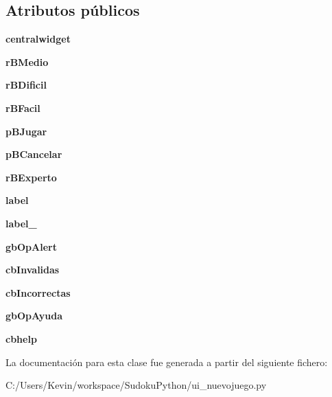 \subsection*{Atributos públicos}
\begin{DoxyCompactItemize}
\item 
{\bfseries centralwidget}\label{classui__nuevojuego_1_1_ui___nuevo_juego_a32725a1c9d0ae4f73ea1b0cec5cbdfbe}

\item 
{\bfseries r\-B\-Medio}\label{classui__nuevojuego_1_1_ui___nuevo_juego_a888ccb3b588cbf785b9616702bc3cf39}

\item 
{\bfseries r\-B\-Dificil}\label{classui__nuevojuego_1_1_ui___nuevo_juego_a701cd00892769efdea575c4cb07cec4c}

\item 
{\bfseries r\-B\-Facil}\label{classui__nuevojuego_1_1_ui___nuevo_juego_a60e661f4819967b6d2f09279f49823f4}

\item 
{\bfseries p\-B\-Jugar}\label{classui__nuevojuego_1_1_ui___nuevo_juego_ad4dc95d57abca02628607c7db8595490}

\item 
{\bfseries p\-B\-Cancelar}\label{classui__nuevojuego_1_1_ui___nuevo_juego_a5fe6252995b4373f69fcd50dfa772022}

\item 
{\bfseries r\-B\-Experto}\label{classui__nuevojuego_1_1_ui___nuevo_juego_a4003ba3feb6933eca550eb5ed7523190}

\item 
{\bfseries label}\label{classui__nuevojuego_1_1_ui___nuevo_juego_a7c90438e0dd91760216404e2faf1d3b6}

\item 
{\bfseries label\-\_}\label{classui__nuevojuego_1_1_ui___nuevo_juego_aa983f05d01b60f683dec9796eb59edf2}

\item 
{\bfseries gb\-Op\-Alert}\label{classui__nuevojuego_1_1_ui___nuevo_juego_ac874e4a3457eb4f7edc5c8b24c69afbf}

\item 
{\bfseries cb\-Invalidas}\label{classui__nuevojuego_1_1_ui___nuevo_juego_af2cfdb7c27411d43f24feac3d068e573}

\item 
{\bfseries cb\-Incorrectas}\label{classui__nuevojuego_1_1_ui___nuevo_juego_a4363a573ef6aac3a4d9390d48929101d}

\item 
{\bfseries gb\-Op\-Ayuda}\label{classui__nuevojuego_1_1_ui___nuevo_juego_a0691cb9fb5c75a26a6f74335fc354794}

\item 
{\bfseries cbhelp}\label{classui__nuevojuego_1_1_ui___nuevo_juego_ac2d65ca1dc216e511d8af6b151496516}

\end{DoxyCompactItemize}


La documentación para esta clase fue generada a partir del siguiente fichero\-:\begin{DoxyCompactItemize}
\item 
C\-:/\-Users/\-Kevin/workspace/\-Sudoku\-Python/ui\-\_\-nuevojuego.\-py\end{DoxyCompactItemize}
